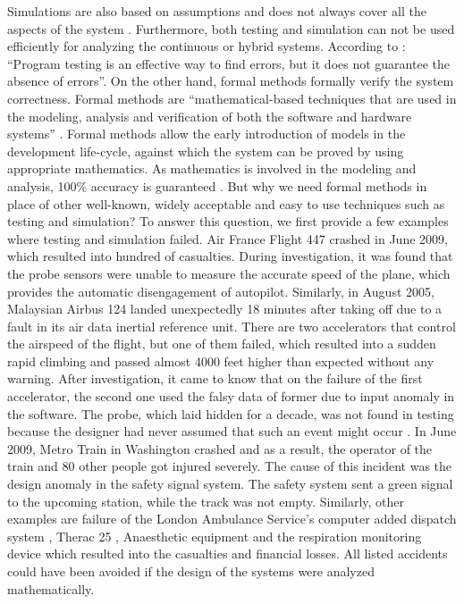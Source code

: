 Simulations are also based on assumptions and does not always cover all the aspects of the system . 
Furthermore, both testing and simulation can not be used efficiently for analyzing the continuous or hybrid systems. According to 
: ``Program testing is an effective way to find errors, but it does not guarantee the absence of errors''.
On the other hand, formal methods formally verify the system correctness. 
Formal methods are ``mathematical-based techniques that are used in the modeling, analysis and verification of both the software and hardware 
systems'' . Formal methods allow the early introduction of models in the development life-cycle, against which the system
can be proved by using appropriate mathematics.
As mathematics is involved in the modeling and analysis, 100\% accuracy is guaranteed .  But why we need 
formal methods in place of other well-known, widely acceptable and easy to use techniques such as testing and simulation? 
To answer this question, we first provide a few examples where testing and simulation failed.
Air France Flight 447 crashed in June 2009, which resulted into hundred of casualties. During investigation, it was found that the probe 
sensors were unable to measure the accurate speed of the plane, which provides the automatic disengagement of autopilot. Similarly, 
in August 2005, Malaysian Airbus 124 landed unexpectedly 18 minutes after taking off due to a fault in its air data inertial 
reference unit. There are two accelerators that control the airspeed of the flight, but one of them failed,  which resulted into a sudden 
rapid climbing and passed almost 4000 feet higher than expected without any warning. After investigation, it came to know that on 
the failure of the first accelerator, the second one used the falsy data of former due to input anomaly in the software. The probe, which laid hidden 
for a decade, was not found in testing because the designer had never assumed that such an event might occur . In June 
2009, Metro Train in Washington crashed and as a result, the operator of the train and 80 other people got injured severely. The cause of this 
incident 
was the design anomaly in the safety signal system. The safety system sent a green signal to the upcoming station, while the track was not empty. 
Similarly, other examples are failure of the London Ambulance Service's computer added dispatch system , Therac 25 , Anaesthetic 
equipment and the respiration monitoring device  which resulted into the  casualties and financial losses. All listed accidents could have
been avoided if the design of the systems were analyzed mathematically.

